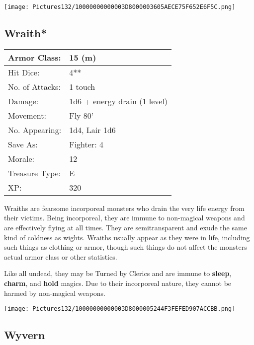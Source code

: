 \documentclass[a4paper,twoside,openany,10pt]{book}
\begin{document}
\begin{multicols}{2}
\begin{center} \texttt{[image: Pictures132/10000000000003D8000003605AECE75F652E6F5C.png]} \end{center}


\subsection*{Wraith*}\label{wraith}

\begin{tabularx}{0.50\textwidth}{@{}lX@{}}
Armor Class: & 15 (m) \\\hline
Hit Dice: & 4** \\\hline
No. of Attacks: & 1 touch \\\hline
Damage: & 1d6 + energy drain (1 level) \\\hline
Movement: & Fly 80' \\\hline
No. Appearing: & 1d4, Lair 1d6 \\\hline
Save As: & Fighter: 4 \\\hline
Morale: & 12 \\\hline
Treasure Type: & E \\\hline
XP: & 320 \\\hline
\end{tabularx}\medskip

Wraiths are fearsome incorporeal monsters who drain the very life energy from their victims. Being incorporeal, they are immune to non-magical weapons and are effectively flying at all times. They are semitransparent and exude the same kind of coldness as wights. Wraiths usually appear as they were in life, including such things as clothing or armor, though such things do not affect the monsters actual armor class or other statistics.

Like all undead, they may be Turned by Clerics and are immune to \textbf{sleep}, \textbf{charm},\textbf{ }and \textbf{hold} magics. Due to their incorporeal nature, they cannot be harmed by non-magical weapons.

\begin{center} \texttt{[image: Pictures132/10000000000003D8000005244F3FEFED907ACCBB.png]} \end{center}

\subsection*{Wyvern}\label{wyvern}


\end{multicols}
\end{document}
